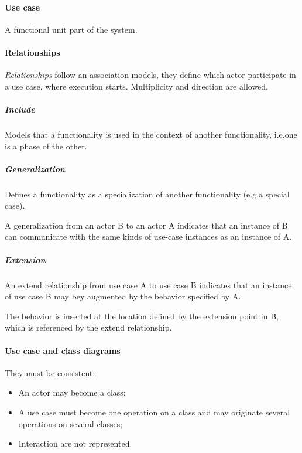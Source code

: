 \paragraph{Use case}
A functional unit part of the system.

\paragraph{Relationships}
\emph{Relationships} follow an association models, they define which actor participate in a use case, where execution starts. Multiplicity and direction are allowed.

\subparagraph{Include}
Models that a functionality is used in the context of another functionality, i.e.\@ one is a phase of the other.

\subparagraph{Generalization}
Defines a functionality as a specialization of another functionality (e.g.\@ a special case).

A generalization from an actor B to an actor A indicates that an instance of B can communicate with the same kinds of use-case instances as an instance of A.

\subparagraph{Extension}
An extend relationship from use case A to use case B indicates that an instance of use case B may bey augmented by the behavior specified by A.

The behavior is inserted at the location defined by the extension point in B, which is referenced by the extend relationship.

\paragraph{Use case and class diagrams}
They must be consistent:
\begin{itemize}
\item An actor may become a class;
\item A use case must become one operation on a class and may originate several operations on several classes;
\item Interaction are not represented.
\end{itemize}